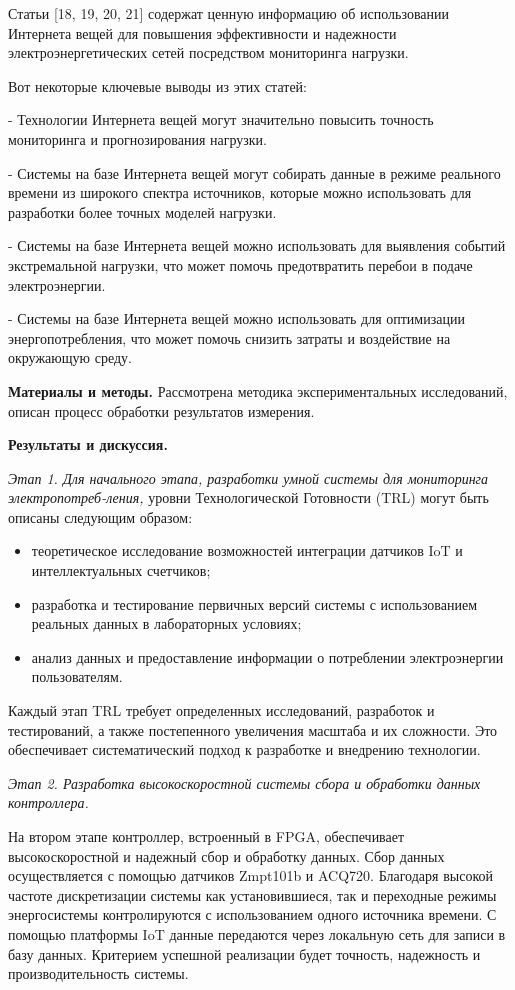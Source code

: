 \begin{multicols}{2}
Статьи {[}18, 19, 20, 21{]} содержат ценную информацию об использовании
Интернета вещей для повышения эффективности и надежности
электроэнергетических сетей посредством мониторинга нагрузки.

Вот некоторые ключевые выводы из этих статей:

- Технологии Интернета вещей могут значительно повысить точность
мониторинга и прогнозирования нагрузки.

- Системы на базе Интернета вещей могут собирать данные в режиме
реального времени из широкого спектра источников, которые можно
использовать для разработки более точных моделей нагрузки.

- Системы на базе Интернета вещей можно использовать для выявления
событий экстремальной нагрузки, что может помочь предотвратить перебои в
подаче электроэнергии.

- Системы на базе Интернета вещей можно использовать для оптимизации
энергопотребления, что может помочь снизить затраты и воздействие на
окружающую среду.

{\bfseries Материалы и методы.} Рассмотрена методика экспериментальных
исследований, описан процесс обработки результатов измерения.

{\bfseries Результаты и дискуссия.}

\emph{Этап 1. Для начального этапа, разработки умной системы для
мониторинга электропотреб-ления,} уровни Технологической Готовности (TRL)
могут быть описаны следующим образом:

\begin{itemize}
  \setlength{\itemindent}{1cm}
\item
  теоретическое исследование возможностей интеграции датчиков IoT и
  интеллектуальных счетчиков;
\item
  разработка и тестирование первичных версий системы с использованием
  реальных данных в лабораторных условиях;
\item
  анализ данных и предоставление информации о потреблении электроэнергии
  пользователям.
\end{itemize}

Каждый этап TRL требует определенных исследований, разработок и
тестирований, а также постепенного увеличения масштаба и их сложности.
Это обеспечивает систематический подход к разработке и внедрению
технологии.

\emph{Этап 2. Разработка высокоскоростной системы сбора и обработки
данных контроллера.}

На втором этапе контроллер, встроенный в FPGA, обеспечивает
высокоскоростной и надежный сбор и обработку данных. Сбор данных
осуществляется с помощью датчиков Zmpt101b и ACQ720. Благодаря высокой
частоте дискретизации системы как установившиеся, так и переходные
режимы энергосистемы контролируются с использованием одного источника
времени. С помощью платформы IoT данные передаются через локальную сеть
для записи в базу данных. Критерием успешной реализации будет точность,
надежность и производительность системы.


\end{multicols}
